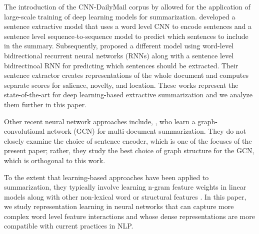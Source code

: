
The introduction of the CNN-DailyMail corpus by \citet{nips15_hermann} 
allowed for the application of large-scale training of deep learning models for summarization.
\citet{cheng2016neural} %
developed a sentence extractive
model that uses a word level 
CNN to encode 
sentences and a sentence level sequence-to-sequence model to predict 
which sentences to include in the summary. Subsequently, 
\citet{nallapati2017summarunner}
proposed a different model using word-level bidirectional recurrent neural 
networks (RNNs) along with a sentence level bidirectinoal RNN for 
predicting which sentences should be extracted. 
Their sentence
extractor creates representations of the whole document and computes 
separate scores for salience, novelty, and location.
These works represent the state-of-the-art for deep learning-based extractive
summarization and we analyze them further in this paper.

Other recent neural network approaches include, \citet{yasunaga2017graph},
who learn a graph-convolutional network (GCN) for multi-document summarization.
They do not 
closely examine the choice of sentence encoder, which is one of the focuses
of the present paper; rather, they study the best choice of graph 
structure for the GCN, which is orthogonal to this work. 

To the extent that learning-based approaches have been applied
to summarization, they typically involve learning n-gram feature weights 
in linear models along with other non-lexical word or 
structural features 
\cite{berg2011jointly,sipos2012large,durrett2016learning}.
In this paper, we study representation learning in
neural networks that can capture more complex word level feature interactions
and whose dense representations are more compatible with current practices
in NLP.







